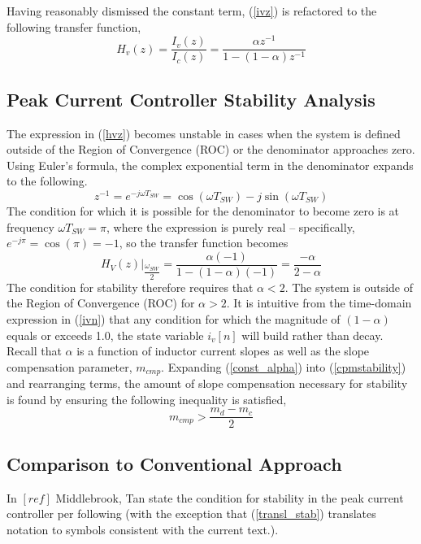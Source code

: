 \documentclass[conference]{IEEEtran}
\begin{document}
Having reasonably dismissed the constant term, (\ref{ivz}) is refactored to the following transfer function,
\begin{equation}
H_v(z) = \frac {I_v(z)} {I_c(z)} = \frac {\alpha z^{-1}} {1 - (1-\alpha) z^{-1}}  \label{hvz}
\end{equation}


\subsection{Peak Current Controller Stability Analysis}

The expression in (\ref{hvz}) becomes unstable in cases when the system is defined outside of the Region of Convergence (ROC) or the denominator approaches zero. Using Euler's formula, the complex exponential term in the denominator expands to the following.
\begin{equation}
	z^{-1} = e^{-j \omega T_{SW}} = \cos (\omega T_{SW}) - j \sin (\omega T_{SW}) 
\end{equation} 
The condition for which it is possible for the denominator to become zero is at frequency $\omega T_{SW} = \pi$, where the expression is purely real -- specifically, $e^{-j \pi} = \cos ( \pi) = -1$, so the transfer function becomes
\begin{equation}
H_V(z) |_{\dfrac{\omega_{SW}}{2}} = \dfrac{\alpha (-1)}{1 - (1 - \alpha) (-1)} = \dfrac{- \alpha}{2 - \alpha} \label{cpmstability}
\end{equation}
The condition for stability therefore requires that $\alpha < 2$.  The system is outside of the Region of Convergence (ROC) for $\alpha > 2$. It is intuitive from the time-domain expression in (\ref{ivn}) that any condition for which the magnitude of $(1 - \alpha)$ equals or exceeds 1.0, the state variable $i_v[n]$ will build rather than decay.
Recall that $\alpha$ is a function of inductor current slopes as well as the slope compensation parameter, $m_{cmp}$.  Expanding (\ref{const_alpha}) into (\ref{cpmstability}) and rearranging terms, the amount of slope compensation necessary for stability is found by ensuring the following inequality is satisfied,
\begin{equation}
m_{cmp} > \dfrac{m_d - m_c}{2} \label{slope_stab}
\end{equation}

\subsection{Comparison to Conventional Approach}
In $[ref]$ Middlebrook, Tan state the condition for stability in the peak current controller per following (with the exception that (\ref{transl_stab}) translates notation to symbols consistent with the current text.).
\end{document}
